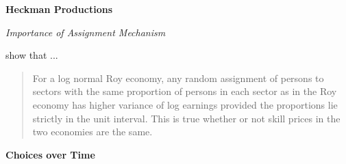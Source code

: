 \begin{frame}
	\begin{center}
		\LARGE\textbf{Heckman Productions}
	\end{center}
\end{frame}

{
	
}
\begin{frame}\begin{center}
		\LARGE\textit{Importance of Assignment Mechanism}
\end{center}\end{frame}
\begin{frame}
	 show that ... \vspace{0.5cm} \\
	\begin{quote} For a log normal Roy economy, any random assignment of persons to sectors with the same proportion of persons in each sector as in the Roy economy has higher variance of log earnings provided the proportions lie strictly in the unit interval. This is true whether or not skill prices in the two economies are the same.
	\end{quote}
\end{frame}
\begin{frame}
	\begin{center} \textbf{Choices over Time}\\\vspace{0.5cm}
	\end{center}
\end{frame}
